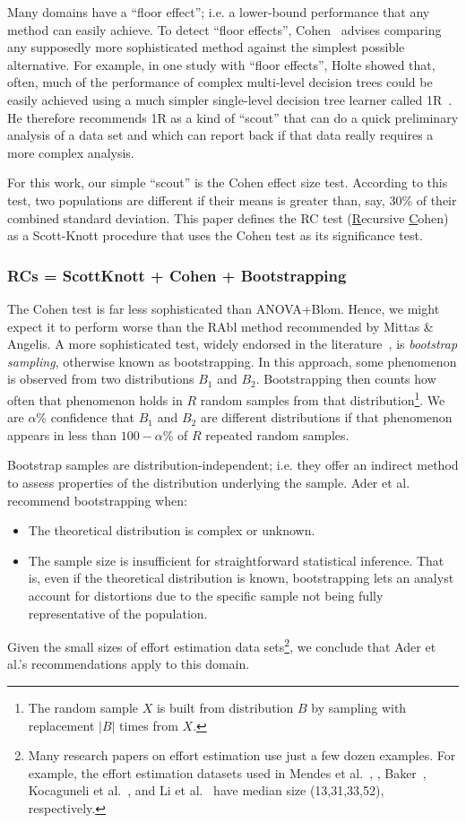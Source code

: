\documentclass{sig-alternate}
\newcommand{\bi}{\begin{itemize}}
\newcommand{\ei}{\end{itemize}}
\begin{document}
Many domains have a ``floor effect''; i.e. a lower-bound performance
that any method can easily achieve. To detect ``floor effects'',
Cohen~\cite{cohen95} advises comparing any supposedly more
sophisticated method against the simplest possible alternative. For
example, in one study with ``floor effects'', Holte showed that,
often, much of the performance of complex multi-level decision trees
could be easily achieved using a much simpler single-level decision
tree learner called 1R~\cite{holte93}. He therefore recommends 1R as a
kind of ``scout'' that can do a quick preliminary analysis of a data
set and which can report back if that data really requires a more
complex analysis.

For this work, our simple ``scout'' is the Cohen effect size test. According to this test,
two populations are different
if their means is greater than, say, 30\% of their combined
standard deviation. This paper defines the RC test 
(\underline{R}ecursive \underline{C}ohen) as a Scott-Knott procedure
that uses the Cohen test as its significance test.

\subsubsection{RCs = ScottKnott + Cohen + Bootstrapping}

The Cohen test is far less
sophisticated than ANOVA+Blom.  Hence, we might expect it to perform
worse than the RAbl method recommended by Mittas \& Angelis.
A more sophisticated test, widely endorsed in the literature~\cite{efron93,ader08},
is {\em bootstrap sampling}, otherwise known as bootstrapping. In this approach,
some phenomenon is observed  from two distributions $B_1$ and $B_2$. Bootstrapping then counts
how often that phenomenon holds in $R$ random samples from that 
distribution\footnote{The
random sample $X$  is built from
distribution $B$ by sampling with replacement $|B|$
times from $X$.}. We are $\alpha$\% confidence that $B_1$ and $B_2$ are different
distributions if that  phenomenon  appears
in less than $100-\alpha$\% of $R$ repeated random samples.

Bootstrap samples are distribution-independent; i.e. they offer an indirect
method to assess properties of the distribution underlying the
sample. 
Ader et al.~\cite{ader08} 
recommend bootstrapping when:
\bi
\item
The theoretical distribution is complex or unknown. 
\item
The sample size is insufficient for straightforward statistical inference. 
That is, even if the theoretical distribution is known,
bootstrapping lets an analyst 
account for distortions due to the specific sample not being fully  representative of the population.
\ei
Given the small sizes of effort estimation data sets\footnote{Many research
papers on effort estimation use just a few dozen examples.
For example,
the effort estimation datasets used in
Mendes et al.~\cite{Mendes2003}, ,
Baker~\cite{baker07}, Kocaguneli et al.~\cite{koc11b}, and Li et al.~\cite{Li2009} have
median size (13,31,33,52), respectively.}, we conclude that Ader et al.'s
recommendations apply to this domain.
\end{document}
